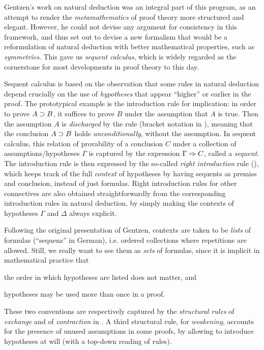 Gentzen's work on natural deduction was an integral part of this program, as an
attempt to render the \emph{metamathematics} of proof theory more structured and
elegant. However, he could not devise any argument for consistency in this
framework, and thus set out to devise a new formalism that would be a
reformulation of natural deduction with better mathematical properties, such as
\emph{symmetries}. This gave us \emph{sequent calculus}, which is widely
regarded as the cornerstone for most developments in proof theory to this day.

Sequent calculus is based on the observation that some rules in natural
deduction depend crucially on the use of \emph{hypotheses} that appear
``higher'' or earlier in the proof. The prototypical example is the introduction
rule  for implication: in order to prove $A \supset B$, it suffices
to prove $B$ under the assumption that $A$ is true. Then the assumption $A$ is
\emph{discharged} by the rule (bracket notation in ), meaning
that the conclusion $A \supset B$ holds \emph{unconditionally}, without the
assumption. In sequent calculus, this relation of provability of a conclusion
$C$ under a collection of assumptions/hypotheses $\Gamma$ is captured by the
expression $\Gamma \Rightarrow C$, called a \emph{sequent}. The introduction rule
 is then expressed by the so-called \emph{right introduction} rule
 (), which keeps track of the full
\emph{context} of hypotheses by having sequents as premiss and conclusion,
instead of just formulas. Right introduction rules for other connectives are
also obtained straightforwardly from the corresponding introduction rules in
natural deduction, by simply making the contexts of hypotheses $\Gamma$ and
$\Delta$ always explicit.

Following the original presentation of Gentzen, contexts are taken to be
\emph{lists} of formulas (``sequenz'' in German), i.e. ordered collections where
repetitions are allowed. Still, we really want to see them as \emph{sets} of
formulas, since it is implicit in mathematical practice that \begin{enumerate*}
\item the order in which hypotheses are listed does not matter, and \item
hypotheses may be used more than once in a proof. \end{enumerate*} These two
conventions are respectively captured by the \emph{structural rules}  of
\emph{exchange} and  of \emph{contraction} in . A
third structural rule,  for \emph{weakening}, accounts for the presence
of unused assumptions in some proofs, by allowing to introduce hypotheses at
will (with a top-down reading of rules).

